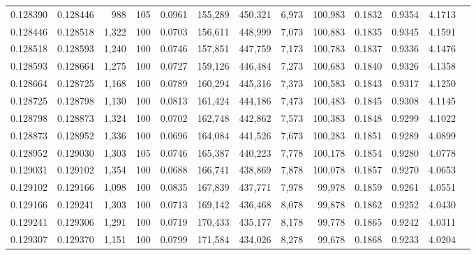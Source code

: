 \begin{tabular}{rrrrrrrrrrrrr}
0.128390 & 0.128446 &   988 & 105 &                                     0.0961 & 155,289 & 450,321 &   6,973 & 100,983 & 0.1832 & 0.9354 & 4.1713 \\
0.128446 & 0.128518 & 1,322 & 100 &                                     0.0703 & 156,611 & 448,999 &   7,073 & 100,883 & 0.1835 & 0.9345 & 4.1591 \\
0.128518 & 0.128593 & 1,240 & 100 &                                     0.0746 & 157,851 & 447,759 &   7,173 & 100,783 & 0.1837 & 0.9336 & 4.1476 \\
0.128593 & 0.128664 & 1,275 & 100 &                                     0.0727 & 159,126 & 446,484 &   7,273 & 100,683 & 0.1840 & 0.9326 & 4.1358 \\
0.128664 & 0.128725 & 1,168 & 100 &                                     0.0789 & 160,294 & 445,316 &   7,373 & 100,583 & 0.1843 & 0.9317 & 4.1250 \\
0.128725 & 0.128798 & 1,130 & 100 &                                     0.0813 & 161,424 & 444,186 &   7,473 & 100,483 & 0.1845 & 0.9308 & 4.1145 \\
0.128798 & 0.128873 & 1,324 & 100 &                                     0.0702 & 162,748 & 442,862 &   7,573 & 100,383 & 0.1848 & 0.9299 & 4.1022 \\
0.128873 & 0.128952 & 1,336 & 100 &                                     0.0696 & 164,084 & 441,526 &   7,673 & 100,283 & 0.1851 & 0.9289 & 4.0899 \\
0.128952 & 0.129030 & 1,303 & 105 &                                     0.0746 & 165,387 & 440,223 &   7,778 & 100,178 & 0.1854 & 0.9280 & 4.0778 \\
0.129031 & 0.129102 & 1,354 & 100 &                                     0.0688 & 166,741 & 438,869 &   7,878 & 100,078 & 0.1857 & 0.9270 & 4.0653 \\
0.129102 & 0.129166 & 1,098 & 100 &                                     0.0835 & 167,839 & 437,771 &   7,978 &  99,978 & 0.1859 & 0.9261 & 4.0551 \\
0.129166 & 0.129241 & 1,303 & 100 &                                     0.0713 & 169,142 & 436,468 &   8,078 &  99,878 & 0.1862 & 0.9252 & 4.0430 \\
0.129241 & 0.129306 & 1,291 & 100 &                                     0.0719 & 170,433 & 435,177 &   8,178 &  99,778 & 0.1865 & 0.9242 & 4.0311 \\
0.129307 & 0.129370 & 1,151 & 100 &                                     0.0799 & 171,584 & 434,026 &   8,278 &  99,678 & 0.1868 & 0.9233 & 4.0204 \\

\end{tabular}
